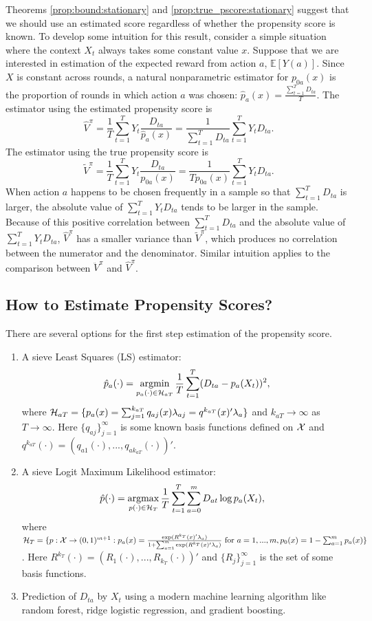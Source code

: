 \documentclass[letterpaper]{article} \usepackage{aaai19}  \usepackage{times}  \usepackage{helvet}  \usepackage{courier}  \usepackage{url}  \usepackage{graphicx}  \frenchspacing  \usepackage{comment}
\newcommand{\argmax}{\mathop{\rm argmax}\limits}
\newcommand{\argmin}{\mathop{\rm argmin}\limits}
\begin{document}
Theorems \ref{prop:bound:stationary} and \ref{prop:true_pscore:stationary} suggest that we should use an estimated score regardless of whether the propensity score is known. To develop some intuition for this result, consider a simple situation where the context $X_t$ always takes some constant value $x$.
Suppose that we are interested in estimation of the expected reward from action $a$, $\mathbb{E}[Y(a)]$.
Since $X$ is constant across rounds, a natural nonparametric estimator for $p_{0a}(x)$ is the proportion of rounds in which action $a$ was chosen: $\hat p_{a}(x)=\frac{\sum_{t=1}^TD_{ta}}{T}$.
The estimator using the estimated propensity score is
$$
\hat V^{\pi}=\frac{1}{T}\sum_{t=1}^TY_t\frac{D_{ta}}{\hat p_{a}(x)}=\frac{1}{\sum_{t=1}^TD_{ta}}\sum_{t=1}^T Y_t D_{ta}.
$$
The estimator using the true propensity score is
$$
\tilde V^{\pi}=\frac{1}{T}\sum_{t=1}^TY_t\frac{D_{ta}}{p_{0a}(x)}=\frac{1}{Tp_{0a}(x)}\sum_{t=1}^T Y_t D_{ta}.
$$
When action $a$ happens to be chosen frequently in a sample so that $\sum_{t=1}^TD_{ta}$ is larger, the absolute value of $\sum_{t=1}^T Y_t D_{ta}$ tends to be larger in the sample.
Because of this positive correlation between $\sum_{t=1}^TD_{ta}$ and the absolute value of $\sum_{t=1}^T Y_t D_{ta}$, $\hat V^\pi$ has a smaller variance than $\tilde V^\pi$, which produces no correlation between the numerator and the denominator.
Similar intuition applies to the comparison between $\ddot V^{\pi}$ and $\hat V^{\pi}$. 



\subsection{How to Estimate Propensity Scores?}\label{section:pscore}
There are several options for the first step estimation of the propensity score.
\begin{enumerate}
	\item A sieve Least Squares (LS) estimator:
	$$
	\hat p_a(\cdot)=\argmin_{p_a(\cdot)\in {\cal H}_{aT}}\frac{1}{T}\sum_{t=1}^T(D_{ta}-p_a(X_t))^2,
	$$
	where ${\cal H}_{aT}=\{p_a(x)=\sum_{j=1}^{k_{aT}}q_{aj}(x)\lambda_{aj}=q^{k_{aT}}(x)'\lambda_a\}$ and $k_{aT}\rightarrow\infty$ as $T\rightarrow\infty$. 
	Here $\{q_{aj}\}_{j=1}^\infty$ is some known basis functions defined on $\cal X$ and $q^{k_{aT}}(\cdot)=(q_{a1}(\cdot),...,q_{ak_{aT}}(\cdot))'$.
	\item A sieve Logit Maximum Likelihood estimator:
	\begin{align*} 
\hat p(\cdot)&= \argmax_{p(\cdot)\in {\cal H}_{T}}\frac{1}{T}\sum_{t=1}^T \sum_{a=0}^m D_{at}\log p_{a}(X_t),
	\end{align*}
	where
	${\cal H}_T=\{p:{\cal X}\rightarrow (0,1)^{m+1}: p_a(x)=\frac{\exp(R^{k_T}(x)'\lambda_a)}{1+\sum_{a=1}^m\exp(R^{k_T}(x)'\lambda_a)}~\text{for}~ a=1,...,m,  p_0(x)=1-\sum_{a=1}^m p_a(x)\}$.
	Here $R^{k_T}(\cdot)=(R_1(\cdot),...,R_{k_T}(\cdot))'$ and $\{R_j\}_{j=1}^\infty$ is the set of some basis functions.
	\item Prediction of $D_{ta}$ by $X_t$ using a modern machine learning algorithm like random forest, ridge logistic regression, and gradient boosting. 
\end{enumerate}
\end{document}

